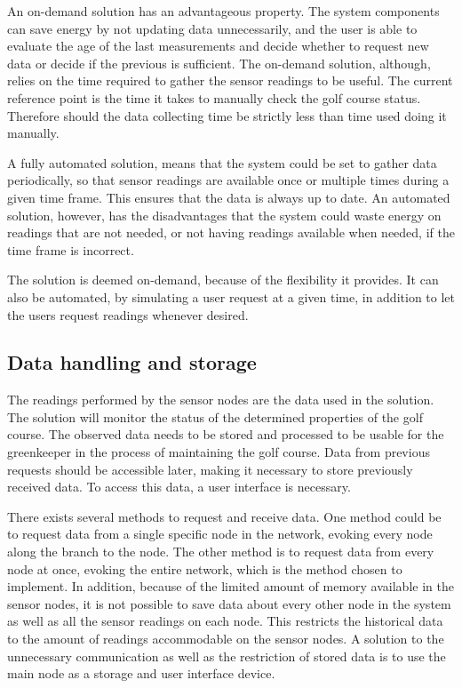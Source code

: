 An on-demand solution has an advantageous property. The system components can save energy by not updating data unnecessarily, and the user is able to evaluate the age of the last measurements and decide whether to request new data or decide if the previous is sufficient. The on-demand solution, although, relies on the time required to gather the sensor readings to be useful. The current reference point is the time it takes to manually check the golf course status. Therefore should the data collecting time be strictly less than time used doing it manually.

A fully automated solution, means that the system could be set to gather data periodically, so that sensor readings are available once or multiple times during a given time frame. This ensures that the data is always up to date. An automated solution, however, has the disadvantages that the system could waste energy on readings that are not needed, or not having readings available when needed, if the time frame is incorrect.

The solution is deemed on-demand, because of the flexibility it provides. It can also be automated, by simulating a user request at a given time, in addition to let the users request readings whenever desired.


\subsection{Data handling and storage}
The readings performed by the sensor nodes are the data used in the solution. The solution will monitor the status of the determined properties of the golf course. The observed data needs to be stored and processed to be usable for the greenkeeper in the process of maintaining the golf course. Data from previous requests should be accessible later, making it necessary to store previously received data. To access this data, a user interface is necessary. 

There exists several methods to request and receive data. One method could be to request data from a single specific node in the network, evoking every node along the branch to the node. The other method is to request data from every node at once, evoking the entire network, which is the method chosen to implement. In addition, because of the limited amount of memory available in the sensor nodes, it is not possible to save data about every other node in the system as well as all the sensor readings on each node. This restricts the historical data to the amount of readings accommodable on the sensor nodes. A solution to the unnecessary communication as well as the restriction of stored data is to use the main node as a storage and user interface device.

